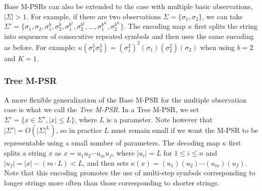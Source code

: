 


Base M-PSRs can also be extended to the case with multiple basic observations, $|\Sigma| > 1$. For example, if there are two observations $\Sigma = \{\sigma_1, \sigma_2\}$, we can take $\Sigma' = \{\sigma_1,\sigma_2,\sigma_1^b,\sigma_2^{b},\sigma_1^{b^2},\sigma_2^{b^2}, ...,\sigma_1^{b^K},\sigma_2^{b^K}\}$. The encoding map $\kappa$ first splits the string into sequences of consecutive repeated symbols and then uses the same encoding as before. For example: $\kappa(\sigma_1^5 \sigma_2^3)=(\sigma_1^2)^2(\sigma_1)(\sigma_2^2)(\sigma_2)$ when using $b = 2$ and $K = 1$.

\subsubsection{Tree M-PSR}
 
A more flexible generalization of the Base M-PSR for the multiple observation case is what we call the \emph{Tree M-PSR}. In a Tree M-PSR, we set $\Sigma'= \{x \in \Sigma^\star, |x| \leq L\}$, where $L$ is a parameter. Note however that $|\Sigma'|= O({|\Sigma|}^L)$, so in practice $L$ must remain small if we want the M-PSR to be representable using a small number of parameters. The decoding map $\kappa$ first splits a string $x$ as $x=u_1 u_2 \cdots u_m u_f$, where $|u_i| = L$ for $1 \leq i \leq n$ and $|u_f| =|x|-(m \cdot L) < L$, and then sets $\kappa(x) = (u_1)(u_2) \cdots (u_m) (u_f)$. Note that this encoding promotes the use of multi-step symbols corresponding to longer strings more often than those corresponding to shorter strings.

